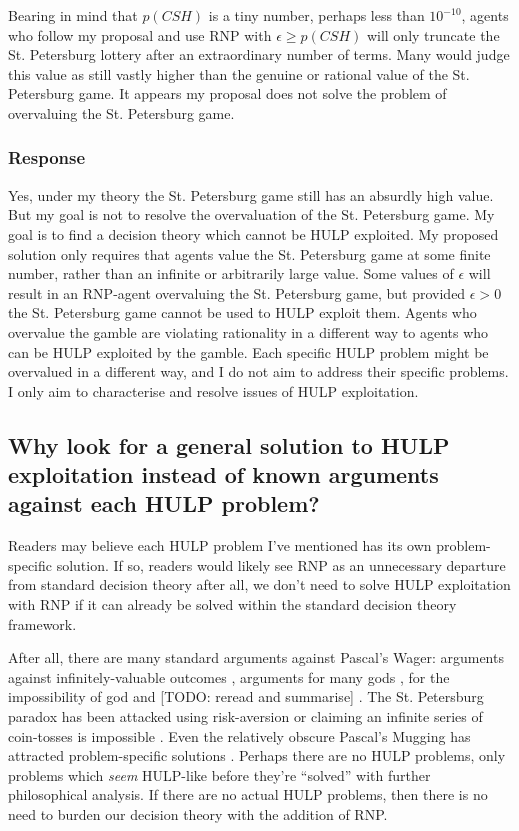 \documentclass{article}
\begin{document}
Bearing in mind that \(p(CSH)\) is a tiny number, perhaps less than \(10^{-10}\), agents who follow my proposal and use RNP with \(\epsilon \geq p(CSH)\) will only truncate the St. Petersburg lottery after an extraordinary number of terms. Many would judge this value as still vastly higher than the genuine or rational value of the St. Petersburg game. It appears my proposal does not solve the problem of overvaluing the St. Petersburg game. 

\subsubsection*{Response}

Yes, under my theory the St. Petersburg game still has an absurdly high value. But my goal is not to resolve the overvaluation of the St. Petersburg game. My goal is to find a decision theory which cannot be HULP exploited. My proposed solution only requires that agents value the St. Petersburg game at some finite number, rather than an infinite or arbitrarily large value. Some values of \(\epsilon\) will result in an RNP-agent overvaluing the St. Petersburg game, but provided \(\epsilon>0\) the St. Petersburg game cannot be used to HULP exploit them. Agents who overvalue the gamble are violating rationality in a different way to agents who can be HULP exploited by the gamble. Each specific HULP problem might be overvalued in a different way, and I do not aim to address their specific problems. I only aim to characterise and resolve issues of HULP exploitation.

\subsection{Why look for a general solution to HULP exploitation instead of known arguments against each HULP problem?} 

Readers may believe each HULP problem I've mentioned has its own problem-specific solution. If so, readers would likely see RNP as an unnecessary departure from standard decision theory \textemdash{} after all, we don't need to solve HULP exploitation with RNP if it can already be solved within the standard decision theory framework.

After all, there are many standard arguments against Pascal's Wager: arguments against infinitely-valuable outcomes \citep{mcclennen1994pascal}, arguments for many gods \citep{saka2001pascal}, for the impossibility of god \citep{oppy1991rescher} and [TODO: reread and summarise] \citep{hajek2003waging}. The St. Petersburg paradox has been attacked using risk-aversion \citep{weirich1984st} or claiming an infinite series of coin-tosses is impossible \citep[pg. 154]{jeffrey1990logic}. Even the relatively obscure Pascal's Mugging has attracted problem-specific solutions \citep{baumann2009counting}. Perhaps there are no HULP problems, only problems which \textit{seem} HULP-like before they're ``solved'' with further philosophical analysis. If there are no actual HULP problems, then there is no need to burden our decision theory with the addition of RNP.
\end{document}
